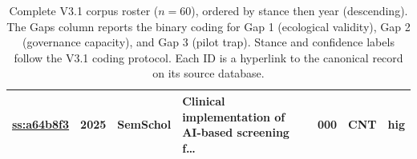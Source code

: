 \begin{table}[p]
\begin{tabularx}{\linewidth}{p{2.2cm} c p{1.4cm} X c p{1cm} p{0.7cm}}
  \href{https://www.semanticscholar.org/paper/a64b8f36fea8352e5597bbc4c106b11dd05886f2}{ss:a64b8f3} & 2025 & SemSchol & Clinical implementation of AI-based screening f\ldots & 000 & CNT & hig \\
    \bottomrule
  \end{tabularx}
  \caption{Complete V3.1 corpus roster ($n=60$), ordered by stance then year (descending). The Gaps column reports the binary coding for Gap 1 (ecological validity), Gap 2 (governance capacity), and Gap 3 (pilot trap). Stance and confidence labels follow the V3.1 coding protocol. Each ID is a hyperlink to the canonical record on its source database.}
  \label{tab:corpus_roster}
\end{table}
